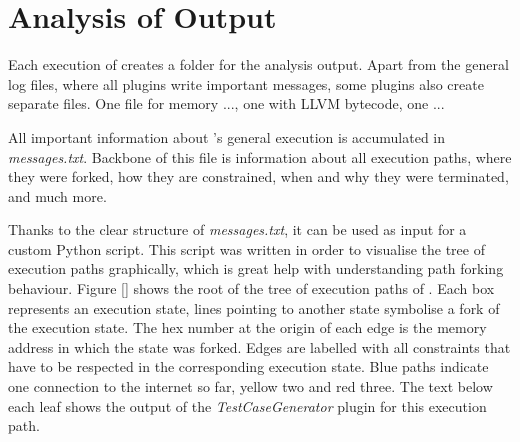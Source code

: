 \section{Analysis of \sse Output}\label{sec:ana}

Each execution of \sse creates a folder for the analysis output.
Apart from the general log files, where all plugins write important messages, some plugins also create separate files.
One file for memory ..., one with LLVM bytecode, one ...

All important information about \sse's general execution is accumulated in \textit{messages.txt}.
Backbone of this file is information about all execution paths, where they were forked, how they are constrained, when and why they were terminated, and much more.

Thanks to the clear structure of \textit{messages.txt}, it can be used as input for a custom Python script. This script was written in order to visualise the tree of execution paths graphically, which is great help with understanding path forking behaviour.
Figure \ref{} shows the root of the tree of execution paths of \app.
Each box represents an execution state, lines pointing to another state symbolise a fork of the execution state.
The hex number at the origin of each edge is the memory address in which the state was forked.
Edges are labelled with all constraints that have to be respected in the corresponding execution state.
Blue paths indicate one connection to the internet so far, yellow two and red three.
The text below each leaf shows the output of the \textit{TestCaseGenerator} plugin for this execution path.


\iffalse
§6	Interpretation of S2E analysis output
		> Execution Traces
		> Gefundene Privacy-Probleme
		> Eventuell nicht gefundene Sachen
		> Probleme bei der Analyse
\fi
